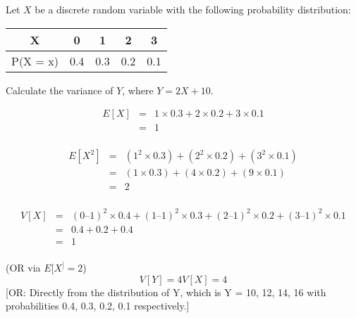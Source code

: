\documentclass[a4paper,12pt]{article}
\begin{document}
\newpage
Let $X$ be a discrete random variable with the following probability distribution:

\begin{center}
\begin{tabular}{ccccc}
X & 0&1 & 2 & 3 \\ \hline
P(X = x)&0.4 & 0.3 & 0.2 & 0.1 \\ \hline
\end{tabular}
\end{center}
Calculate the variance of $Y$, where $Y = 2X + 10$.

\newpage

\begin{eqnarray*}
E[X] &=& 1\times0.3 + 2\times0.2 + 3\times0.1\\
&=& 1\\
\end{eqnarray*}

\begin{eqnarray*}
E[X^2] 
&=& (1^2\times0.3) + (2^2\times0.2) + (3^2\times0.1)\\
&=& (1 \times 0.3) + (4 \times 0.2) + (9 \times 0.1) \\
&=& 2 \\
\end{eqnarray*}



\begin{eqnarray*}
V[X] &=& (0 –1)^2 \times 0.4 + (1 – 1)^2 \times 0.3 + (2 – 1)^2 \times 0.2 + (3 – 1)^2 \times 0.1\\
&=& 0.4 + 0.2 + 0.4 \\
&=& 1\\
\end{eqnarray*}

(OR via $E[X^ ] = 2$)
\[V[Y] = 4V[X] = 4\]
[OR: Directly from the distribution of Y, which is Y = 10, 12, 14, 16 with probabilities 0.4, 0.3, 0.2, 0.1 respectively.]

\end{document}
